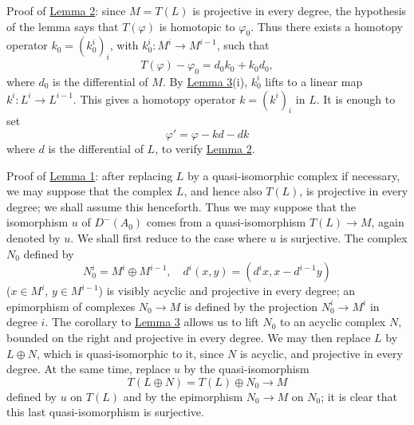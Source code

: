 \documentclass[11pt]{article}
\begin{document}
Proof of \hyperref[sga5:XV:lemma:2:2]{Lemma 2}: since $M=T(L)$ is projective in every degree, the hypothesis of the lemma says that $T(\varphi)$ is homotopic to $\varphi_0$. Thus there exists a homotopy operator $k_0=(k_0^i)_i$, with $k_0^i:M^i\to M^{i-1}$, such that
\[
T(\varphi)-\varphi_0=d_0k_0+k_0d_0,
\]
where $d_0$ is the differential of $M$. By \hyperref[sga5:XV:lemma:3:2]{Lemma 3}(i), $k_0^i$ lifts to a linear map $k^i:L^i\to L^{i-1}$. This gives a homotopy operator $k=(k^i)_i$ in $L$. It is enough to set
\[
\varphi'=\varphi-kd-dk
\]
where $d$ is the differential of $L$, to verify \hyperref[sga5:XV:lemma:2:2]{Lemma 2}.

Proof of \hyperref[sga5:XV:lemma:1:2]{Lemma 1}: after replacing $L$ by a quasi-isomorphic complex if necessary, we may suppose that the complex $L$, and hence also $T(L)$, is projective in every degree; we shall assume this henceforth. Thus we may suppose that the isomorphism $u$ of $D^-(A_0)$ comes from a quasi-isomorphism $T(L)\to M$, again denoted by $u$. We shall first reduce to the case where $u$ is surjective. The complex $N_0$ defined by
\[
N_0^i=M^i\oplus M^{i-1},
\quad
 d^i(x,y)=(d^i x,x-d^{i-1}y)
\]
($x\in M^i$, $y\in M^{i-1}$) is visibly acyclic and projective in every degree; an epimorphism of complexes $N_0\to M$ is defined by the projection $N_0^i\to M^i$ in degree $i$. The corollary to \hyperref[sga5:XV:lemma:3:2]{Lemma 3} allows us to lift $N_0$ to an acyclic complex $N$, bounded on the right and projective in every degree. We may then replace $L$ by $L\oplus N$, which is quasi-isomorphic to it, since $N$ is acyclic, and projective in every degree. At the same time, replace $u$ by the quasi-isomorphism
\[
T(L\oplus N)=T(L)\oplus N_0\longrightarrow M
\]
defined by $u$ on $T(L)$ and by the epimorphism $N_0\to M$ on $N_0$; it is clear that this last quasi-isomorphism is surjective.
\end{document}
